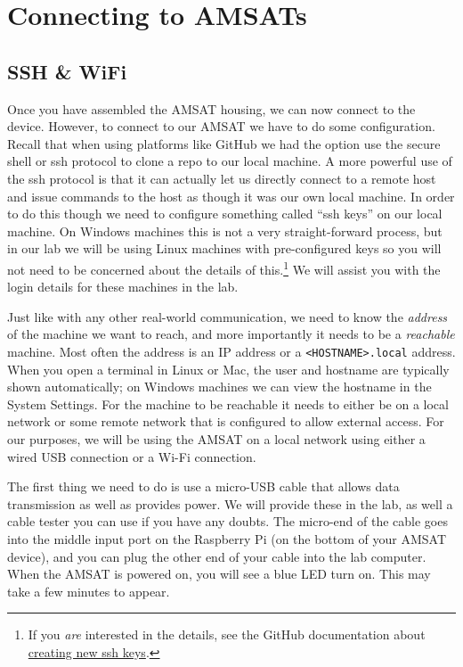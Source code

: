 \documentclass{tufte-book}
\begin{document}
\section{Connecting to AMSATs}

\subsection{SSH \& WiFi}
\label{subsec:ssh}

Once you have assembled the AMSAT housing, we can now connect to the device. However, to connect to our AMSAT we have to do some configuration. Recall that when using platforms like GitHub we had the option use the secure shell or ssh protocol to clone a repo to our local machine. A more powerful use of the ssh protocol is that it can actually let us directly connect to a remote host and issue commands to the host as though it was our own local machine. In order to do this though we need to configure something called ``ssh keys'' on our local machine. On Windows machines this is not a very straight-forward process, but in our lab we will be using Linux machines with pre-configured keys so you will not need to be concerned about the details of this.\footnote{If you \textit{are} interested in the details, see the GitHub documentation about \href{https://docs.github.com/en/authentication/connecting-to-github-with-ssh/generating-a-new-ssh-key-and-adding-it-to-the-ssh-agent?platform=linux}{creating new ssh keys}.} We will assist you with the login details for these machines in the lab.

Just like with any other real-world communication, we need to know the \textit{address} of the machine we want to reach, and more importantly it needs to be a \textit{reachable} machine. Most often the address is an IP address or a \verb|<HOSTNAME>.local| address. When you open a terminal in Linux or Mac, the user and hostname are typically shown automatically; on Windows machines we can view the hostname in the System Settings. For the machine to be reachable it needs to either be on a local network or some remote network that is configured to allow external access. For our purposes, we will be using the AMSAT on a local network using either a wired USB connection or a Wi-Fi connection.


The first thing we need to do is use a micro-USB cable that allows data transmission as well as provides power. We will provide these in the lab, as well a cable tester you can use if you have any doubts. The micro-end of the cable goes into the middle input port on the Raspberry Pi (on the bottom of your AMSAT device), and you can plug the other end of your cable into the lab computer. When the AMSAT is powered on, you will see a blue LED turn on. This may take a few minutes to appear.
\end{document}

